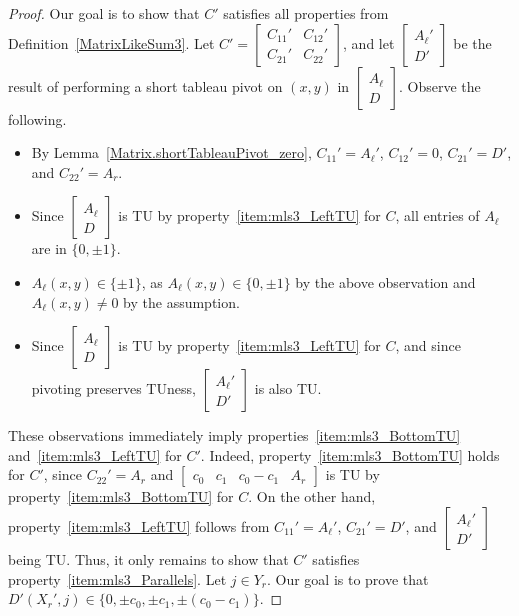 \begin{proof}
    \leanok
    Our goal is to show that $C'$ satisfies all properties from Definition~\ref{MatrixLikeSum3}. Let $C' = \begin{bmatrix} C_{11}' & C_{12}' \\ C_{21}' & C_{22}' \end{bmatrix}$, and let $\begin{bmatrix} A_{\ell}' \\ D' \end{bmatrix}$ be the result of performing a short tableau pivot on $(x, y)$ in $\begin{bmatrix} A_{\ell} \\ D \end{bmatrix}$. Observe the following.

    \begin{itemize}
        \item By Lemma~\ref{Matrix.shortTableauPivot_zero}, $C_{11}' = A_{\ell}'$, $C_{12}' = 0$, $C_{21}' = D'$, and $C_{22}' = A_{r}$.
        \item Since $\begin{bmatrix} A_{\ell} \\ D \end{bmatrix}$ is TU by property~\ref{item:mls3_LeftTU} for $C$, all entries of $A_{\ell}$ are in $\{0, \pm 1\}$.
        \item $A_{\ell} (x, y) \in \{\pm 1\}$, as $A_{\ell} (x, y) \in \{0, \pm 1\}$ by the above observation and $A_{\ell} (x, y) \neq 0$ by the assumption.
        \item Since $\begin{bmatrix} A_{\ell} \\ D \end{bmatrix}$ is TU by property~\ref{item:mls3_LeftTU} for $C$, and since pivoting preserves TUness, $\begin{bmatrix} A_{\ell}' \\ D' \end{bmatrix}$ is also TU.
    \end{itemize}

    These observations immediately imply properties~\ref{item:mls3_BottomTU} and~\ref{item:mls3_LeftTU} for $C'$. Indeed, property~\ref{item:mls3_BottomTU} holds for $C'$, since $C_{22}' = A_{r}$ and $\begin{bmatrix} c_{0} & c_{1} & c_{0} - c_{1} & A_{r} \end{bmatrix}$ is TU by property~\ref{item:mls3_BottomTU} for $C$. On the other hand, property~\ref{item:mls3_LeftTU} follows from $C_{11}' = A_{\ell}'$, $C_{21}' = D'$, and $\begin{bmatrix} A_{\ell}' \\ D' \end{bmatrix}$ being TU. Thus, it only remains to show that $C'$ satisfies property~\ref{item:mls3_Parallels}. Let $j \in Y_{r}$. Our goal is to prove that $D' (X_{r}', j) \in \{0, \pm c_{0}, \pm c_{1}, \pm (c_{0} - c_{1})\}$.


\end{proof}
